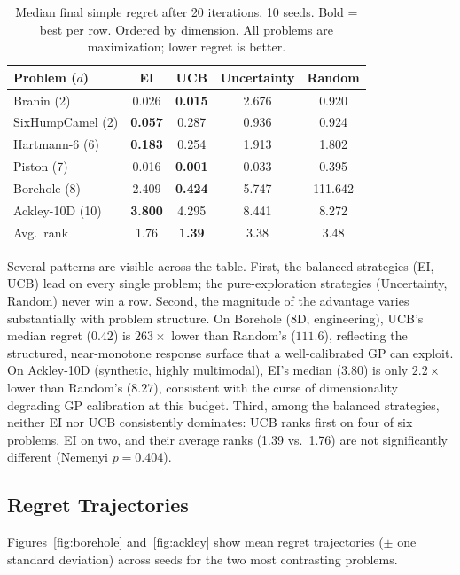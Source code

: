 \begin{table}[t]
\centering
\caption{Median final simple regret after 20 iterations, 10 seeds.
  Bold = best per row.  Ordered by dimension.
  All problems are maximization; lower regret is better.}
\label{tab:median}
\begin{tabular}{lcccc}
\toprule
Problem ($d$) & EI & UCB & Uncertainty & Random \\
\midrule
Branin (2)       & 0.026 & \textbf{0.015} & 2.676 & 0.920 \\
SixHumpCamel (2) & \textbf{0.057} & 0.287 & 0.936 & 0.924 \\
Hartmann-6 (6)   & \textbf{0.183} & 0.254 & 1.913 & 1.802 \\
Piston (7)       & 0.016 & \textbf{0.001} & 0.033 & 0.395 \\
Borehole (8)     & 2.409 & \textbf{0.424} & 5.747 & 111.642 \\
Ackley-10D (10)  & \textbf{3.800} & 4.295 & 8.441 & 8.272 \\
\midrule
Avg.\ rank & 1.76 & \textbf{1.39} & 3.38 & 3.48 \\
\bottomrule
\end{tabular}
\end{table}

Several patterns are visible across the table.
First, the balanced strategies (EI, UCB) lead on every single problem;
the pure-exploration strategies (Uncertainty, Random) never win a row.
Second, the magnitude of the advantage varies substantially with problem
structure.
On Borehole (8D, engineering), UCB's median regret ($0.42$) is
$263\times$ lower than Random's ($111.6$), reflecting the structured,
near-monotone response surface that a well-calibrated GP can exploit.
On Ackley-10D (synthetic, highly multimodal), EI's median ($3.80$)
is only $2.2\times$ lower than Random's ($8.27$), consistent with
the curse of dimensionality degrading GP calibration at this budget.
Third, among the balanced strategies, neither EI nor UCB consistently
dominates: UCB ranks first on four of six problems, EI on two, and
their average ranks (1.39 vs.\ 1.76) are not significantly different
(Nemenyi $p = 0.404$).

\subsection{Regret Trajectories}
\label{sec:trajectories}

Figures~\ref{fig:borehole} and~\ref{fig:ackley} show mean regret
trajectories ($\pm$ one standard deviation) across seeds for the two
most contrasting problems.

